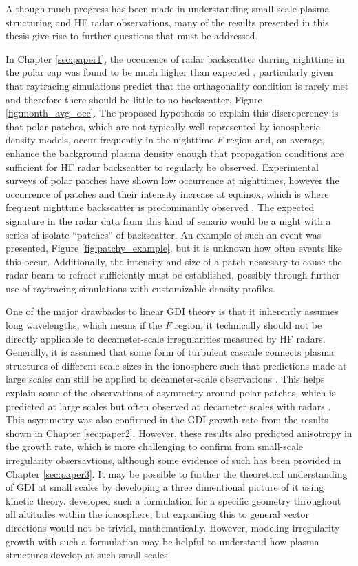 Although much progress has been made in understanding small-scale plasma structuring and HF radar observations, many of the results presented in this thesis give rise to further questions that must be addressed.

In Chapter \ref{sec:paper1}, the occurence of radar backscatter durring nighttime in the polar cap was found to be much higher than expected \citep{Bristow2011}, particularly given that raytracing simulations predict that the orthagonality condition is rarely met and therefore there should be little to no backscatter, Figure \ref{fig:month_avg_occ}.  The proposed hypothesis to explain this discreperency is that polar patches, which are not typically well represented by ionospheric density models, occur frequently in the nighttime \(F\) region and, on average, enhance the background plasma density enough that propagation conditions are sufficient for HF radar backscatter to regularly be observed.  Experimental surveys of polar patches have shown low occurrence at nighttimes, however the occurrence of patches and their intensity increase at equinox, which is where frequent nighttime backscatter is predominantly observed \citep{Rodger1996}.  The expected signature in the radar data from this kind of senario would be a night with a series of isolate ``patches'' of backscatter.  An example of such an event was presented, Figure \ref{fig:patchy_example}, but it is unknown how often events like this occur.  Additionally, the intensity and size of a patch nessesary to cause the radar beam to refract sufficiently must be established, possibly through further use of raytracing simulations with customizable density profiles.

One of the major drawbacks to linear GDI theory is that it inherently assumes long wavelengths, which means if the \(F\) region, it technically should not be directly applicable to decameter-scale irregularities measured by HF radars.  Generally, it is assumed that some form of turbulent cascade connects plasma structures of different scale sizes in the ionosphere such that predictions made at large scales can still be applied to decameter-scale observations \citep{Tsunoda1988}.  This helps explain some of the observations of asymmetry around polar patches, which is predicted at large scales but often observed at decameter scales with radars \citep[e.g.][]{Weber1984,Milan2002b,Koustov2012}.  This asymmetry was also confirmed in the GDI growth rate from the results shown in Chapter \ref{sec:paper2}.  However, these results also predicted anisotropy in the growth rate, which is more challenging to confirm from small-scale irregularity obsersavtions, although some evidence of such has been provided in Chapter \ref{sec:paper3}.  It may be possible to further the theoretical understanding of GDI at small scales by developing a three dimentional picture of it using kinetic theory.  \citet{Basu1995} developed such a formulation for a specific geometry throughout all altitudes within the ionosphere, but expanding this to general vector directions would not be trivial, mathematically.  However, modeling irregularity growth with such a formulation may be helpful to understand how plasma structures develop at such small scales.

